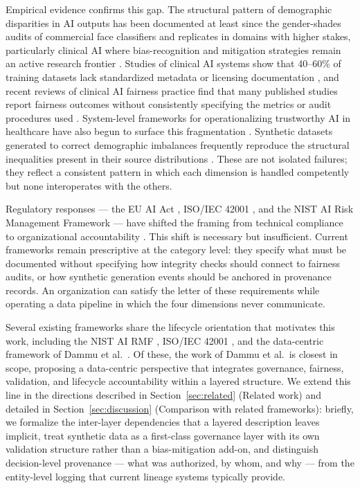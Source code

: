 \documentclass[11pt]{article}
\begin{document}
Empirical evidence confirms this gap. The structural pattern of demographic disparities in AI outputs has been documented at least since the gender-shades audits of commercial face classifiers \cite{Buolamwini2018} and replicates in domains with higher stakes, particularly clinical AI where bias-recognition and mitigation strategies remain an active research frontier \cite{Hasanzadeh2025}. Studies of clinical AI systems show that 40--60\% of training datasets lack standardized metadata or licensing documentation \cite{Schwabe2024,Nastoska2025}, and recent reviews of clinical AI fairness practice find that many published studies report fairness outcomes without consistently specifying the metrics or audit procedures used \cite{Cross2024,Hanna2025}. System-level frameworks for operationalizing trustworthy AI in healthcare have also begun to surface this fragmentation \cite{MorenoSanchez2026}. Synthetic datasets generated to correct demographic imbalances frequently reproduce the structural inequalities present in their source distributions \cite{ShahulHameed2024,Kapania2025}. These are not isolated failures; they reflect a consistent pattern in which each dimension is handled competently but none interoperates with the others.

Regulatory responses --- the EU AI Act \cite{EU_AI_Act}, ISO/IEC 42001 \cite{ISO_42001_2023}, and the NIST AI Risk Management Framework \cite{NIST_AIRM_2023} --- have shifted the framing from technical compliance to organizational accountability \cite{Bekkum2023,Nastoska2025}. This shift is necessary but insufficient. Current frameworks remain prescriptive at the category level: they specify what must be documented without specifying how integrity checks should connect to fairness audits, or how synthetic generation events should be anchored in provenance records. An organization can satisfy the letter of these requirements while operating a data pipeline in which the four dimensions never communicate.

Several existing frameworks share the lifecycle orientation that motivates this work, including the NIST AI RMF \cite{NIST_AIRM_2023}, ISO/IEC 42001 \cite{ISO_42001_2023}, and the data-centric framework of Dammu et al.\ \cite{Dammu2026}. Of these, the work of Dammu et al.\ is closest in scope, proposing a data-centric perspective that integrates governance, fairness, validation, and lifecycle accountability within a layered structure. We extend this line in the directions described in Section~\ref{sec:related} (Related work) and detailed in Section~\ref{sec:discussion} (Comparison with related frameworks): briefly, we formalize the inter-layer dependencies that a layered description leaves implicit, treat synthetic data as a first-class governance layer with its own validation structure rather than a bias-mitigation add-on, and distinguish decision-level provenance --- what was authorized, by whom, and why --- from the entity-level logging that current lineage systems typically provide.
\end{document}
